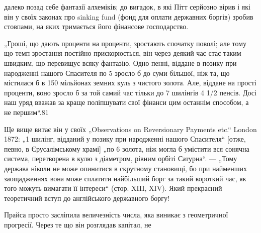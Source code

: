 далеко позад себе фантазії алхеміків; до вигадок, в які Пітт
серйозно вірив і які він у своїх законах про sinking fund (фонд
для оплати державних боргів) зробив стовпами, на яких тримається
його фінансове господарство.

„Гроші, що дають проценти на проценти, зростають спочатку
поволі; але тому що темп зростання постійно прискорюється, він
через деякий час стає таким швидким, що перевищує всяку фантазію.
Одно пенні, віддане в позику при народженні нашого
Спасителя по 5%
зросло б до суми більшої, ніж та, що містилася б в 150 мільйонах
земних куль з чистого золота. Але, віддане на прості проценти,
воно зросло б за той самий час тільки до 7 шилінгів 4 1/2 пенсів.
Досі наш уряд вважав за краще поліпшувати свої фінанси цим
останнім способом, а не першим“.81

Ще вище витає він у своїх „Observations on Reversionary Payments
etc.“ London 1872: „1 шилінг, відданий у позику при народженні
нашого Спасителя“ [отже, певно, в Єрусалімському храмі]
„по 6%
золота, ніж могла б умістити вся сонячна система, перетворена
в кулю з діаметром, рівним орбіті Сатурна“. — „Тому держава
ніколи не може опинитися в скрутному становищі, бо при найменших
заощадженнях вона може сплатити найбільший борг за
такий короткий час, як того можуть вимагати її інтереси“ (стор.
XIII, XIV). Який прекрасний теоретичний вступ до англійського
державного боргу!

Прайса просто засліпила величезність числа, яка виникає з геометричної
прогресії. Через те що він розглядав капітал, не

